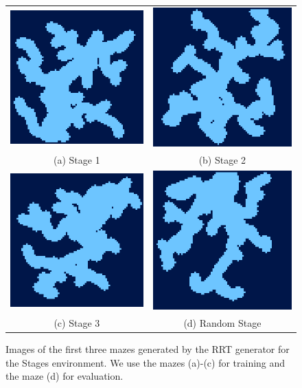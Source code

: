 \begin{figure}[htp]
    \begin{center}
        \begin{tabular}{cc}
            \includegraphics[clip, width=0.25\columnwidth]{figures/evaluation/randomness/instances/stage0_upscaled.png} &
            \includegraphics[clip, width=0.25\columnwidth]{figures/evaluation/randomness/instances/stage1_upscaled.png} \\
            {\small (a) Stage 1} & {\small (b) Stage 2} \\
            \addlinespace[0.25cm]
            \includegraphics[clip, width=0.25\columnwidth]{figures/evaluation/randomness/instances/stage2_upscaled.png} &
            \includegraphics[clip, width=0.25\columnwidth]{figures/evaluation/randomness/instances/stage3_upscaled.png} \\
            {\small (c) Stage 3} & {\small (d) Random Stage} \\
            
        \end{tabular}
    \end{center}
    \caption[Images of Random Mazes Used by the Stages Environment]{Images of the first three mazes generated by the RRT generator for the Stages environment. We use the mazes (a)-(c) for training and the maze (d) for evaluation.} \label{fig:Eval/RandomMaze/Stages}
\end{figure}

